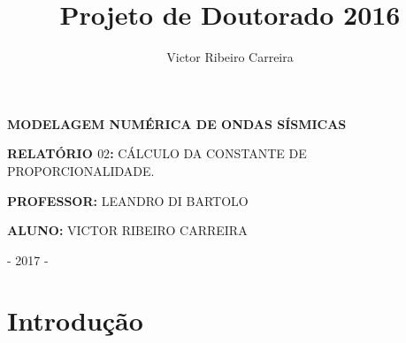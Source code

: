 \documentclass[12pt,a4paper,final]{report}%
\author{Victor Ribeiro Carreira}
\title{Projeto de Doutorado 2016}
\begin{document}
\thispagestyle{empty}%


\begin{figure}[H]
\centering
{}
\end{figure}

\vspace{1cm}

\begin{center}
\textbf{MODELAGEM NUMÉRICA DE ONDAS SÍSMICAS}
\end{center}

\vspace{3cm}

\begin{center}
\textbf{RELATÓRIO $02$:} CÁLCULO DA CONSTANTE DE PROPORCIONALIDADE.
\end{center}

\vspace{2.5cm}

\begin{center}
\textbf{PROFESSOR:} LEANDRO DI BARTOLO
\end{center}

\begin{center}
\textbf{ALUNO:} VICTOR RIBEIRO CARREIRA
\end{center}

\vspace{10cm}

\begin{center}
- 2017 -
\end{center}



\pagebreak%
\section*{Introdução}
\end{document}
